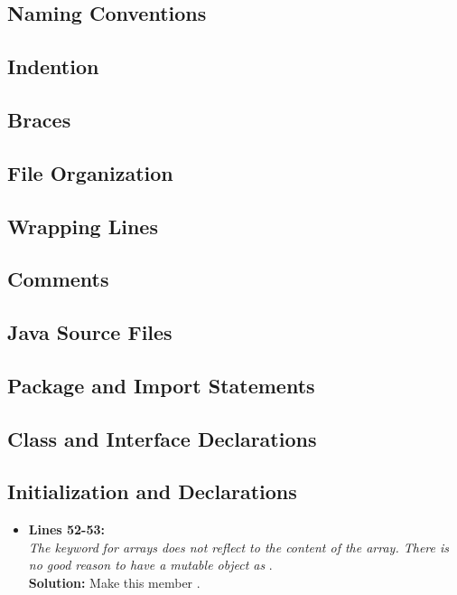 
\subsection{Naming Conventions}
\subsection{Indention}
\subsection{Braces}
\subsection{File Organization}
\subsection{Wrapping Lines}
\subsection{Comments}
\subsection{Java Source Files}
\subsection{Package and Import Statements}
\subsection{Class and Interface Declarations}
\subsection{Initialization and Declarations}
\begin{itemize}
	\item \textbf{Lines 52-53:}\\
\textit{ The keyword } \textit{for arrays does not reflect to the content of the array. There is no good reason to have a mutable object as} . \\
\textbf{Solution: }Make this member . 

\end{itemize}

